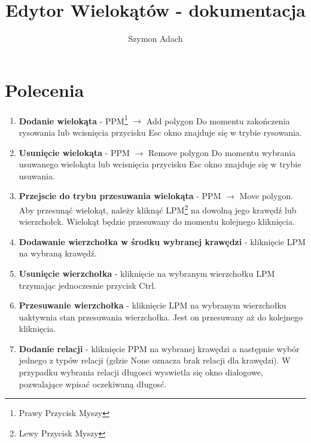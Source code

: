 \documentclass[]{article}
\title{Edytor Wielokątów - dokumentacja}
\author{Szymon Adach}
\begin{document}
\maketitle

\section{Polecenia}
\begin{enumerate}
	\item \textbf{Dodanie wielokąta} - PPM\footnote{Prawy Przycisk Myszy} $\rightarrow$ Add polygon \newline
	Do momentu zakończenia rysowania lub wcisnięcia przycisku Esc okno znajduje się w trybie rysowania.
	\item \textbf{Usunięcie wielokąta} - PPM $\rightarrow$ Remove polygon
	Do momentu wybrania usuwanego wielokąta lub wcisnięcia przycisku Esc okno znajduje się w trybie usuwania.
	\item \textbf{Przejscie do trybu przesuwania wielokąta} - PPM $\rightarrow$ Move polygon. \newline
	Aby przesunąć wielokąt, należy kliknąć LPM\footnote{Lewy Przycisk Myszy} na dowolną jego krawędź lub wierzchołek. Wielokąt będzie przesuwany do momentu kolejnego kliknięcia.
	\item \textbf{Dodawanie wierzchołka w środku wybranej krawędzi} - kliknięcie LPM na wybraną krawędź.
	\item \textbf{Usunięcie wierzchołka} - kliknięcie na wybranym wierzchołku LPM trzymając jednoczesnie przycisk Ctrl.
	\item \textbf{Przesuwanie wierzchołka} - kliknięcie LPM na wybranym wierzchołku uaktywnia stan przesuwania wierzchołka. Jest on przesuwany aż do kolejnego kliknięcia.
	\item \textbf{Dodanie relacji} - kliknięcie PPM na wybranej krawędzi a następnie wybór jednego z typów relacji (gdzie None oznacza brak relacji dla krawędzi). W przypadku wybrania relacji długosci wyswietla się okno dialogowe, pozwalające wpisać oczekiwaną długosć.
\end{enumerate}
\end{document}

